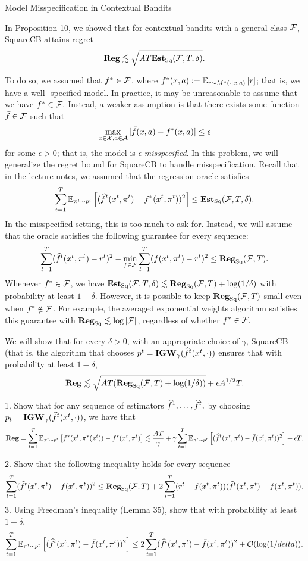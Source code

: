 \begin{exercise}[]{Model Misspecification in Contextual Bandits}
\end{exercise}
In Proposition 10, we showed that for contextual bandits with a general class $\F$,
 SquareCB attains regret
 \[ \Reg \lesssim \sqrt{AT \EstSq(\F,T,\delta)}.\]

 To do so, we assumed that $f^* \in \F$, where 
 $f^*(x,a) := \EEs{r}{r\sim M^*(\cdot|x,a)}$; that is, we have a well- specified model. 
 In practice, it may be unreasonable to assume that we have $f^* \in \F.$
 Instead, a weaker assumption is that there exists some function $\bar f \in \F$ such that
 \[ \max_{x \in \X, a \in \A} |\bar f(x,a)-f^*(x,a)|\leq \epsilon\]
 for some $\epsilon >0$; that is, the model is $\epsilon$-\textit{misspecified}. In this problem,
 we will generalize the regret bound for SquareCB to handle misspecification. Recall that in the lecture notes, we assumed
 that the regression oracle satisfies
 \[ \sum_{t=1}^T \EEs{(\wh f^t(x^t,\pi^t)-f^*(x^t,\pi^t))^2}{\pi^t \sim p^t}\leq \EstSq(\F,T,\delta).\]
 In the misspecified setting, this is too much to ask for. 
 Instead, we will assume that the oracle satisfies the following guarantee for every sequence:
\[ \sum_{t=1}^T(\wh f^t(x^t,\pi^t)-r^t)^2 -\min_{f\in \F}\sum_{t=1}^T(f(x^t,\pi^t)-r^t)^2\leq \Reg_{\text{Sq}}(\F,T).\]
Whenever $f^* \in \F$, we have $\EstSq(\F,T,\delta)\lesssim \Reg_{\text{Sq}}(\F,T)+ \log(1/\delta)$ with probability at least $1-\delta$.
However, it is possible to keep $\Reg_{\text{Sq}}(\F,T)$ small even when $f^* \notin \F$.
For example, the averaged exponential weights algorithm satisfies this guarantee with 
$\Reg_{\text{Sq}} \lesssim \log |\F|$, regardless of whether $f^* \in \F.$

We will show that for every $\delta > 0$, with an appropriate choice of $\gamma$, SquareCB (that is, the algorithm that chooses $p^t =\textbf{IGW}_\gamma(\wh f^t(x^t,\cdot))$ 
ensures that with probability at least $1-\delta$,
\[ \Reg \lesssim \sqrt{AT (\Reg_{\text{Sq}}(\F,T)+\log(1/\delta))} +\epsilon A^{1/2}T.\]

1.  Show that for any sequence of estimators 
$\wh f^1 ,\ldots,\wh f^t,$ by choosing $p_t = \textbf{IGW}_\gamma(\wh f^t(x^t , \cdot))$, we have that
\[\Reg= \sum_{t=1}^T \EEs{f^*(x^t,\pi^*(x^t))-f^*(x^t,\pi^t)}{\pi^t\sim p^t} \lesssim \frac{AT}{\gamma}+ \gamma \sum_{t=1}^T
\EEs{(\wh f^t(x^t,\pi^t)-\bar f(x^t,\pi^t))^2}{\pi^t \sim p^t}+\epsilon T.\]

2. Show that the following inequality holds for every sequence
\[ \sum_{t=1}^T(\wh f^t(x^t,\pi^t)-\bar f(x^t,\pi^t))^2\leq \Reg_{\text{Sq}}(\F,T)+2\sum_{t=1}^T(r^t-\bar f(x^t,\pi^t))(\wh f^t(x^t,\pi^t)-\bar f(x^t,\pi^t)).\]
3. Using Freedman’s inequality (Lemma 35), show that with probability at least $1-\delta$,
\[\sum_{t=1}^T \EEs{(\wh f^t (x^t,\pi^t)-\bar f(x^t,\pi^t))^2}{\pi^t \sim p^t} \leq 2\sum_{t=1}^T(\wh f^t (x^t, \pi^t)-\bar f (x^t,\pi^t))^2 + \OO(\log(1/delta)).\]

